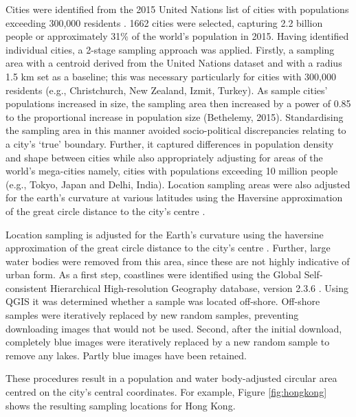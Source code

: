 \documentclass[final,3p,times,authoryear]{elsarticle}
\begin{document}
Cities were identified from the 2015 United Nations list of cities with populations exceeding 300,000 residents \citep{UN2014}. 1662 cities were selected, capturing 2.2 billion people or approximately 31\% of the world's population in 2015. Having identified individual cities, a 2-stage sampling approach was applied. Firstly, a sampling area with a centroid derived from the United Nations dataset and with a radius 1.5 km set as a baseline; this was necessary particularly for cities with 300,000 residents (e.g., Christchurch, New Zealand, Izmit, Turkey). As sample cities' populations increased in size, the sampling area then increased by a power of 0.85 to the proportional increase in population size (Bethelemy, 2015). Standardising the sampling area in this manner avoided socio-political discrepancies relating to a city's `true' boundary. Further, it captured differences in population density and shape between cities while also appropriately adjusting for areas of the world's mega-cities namely, cities with populations exceeding 10 million people (e.g., Tokyo, Japan and Delhi, India). Location sampling areas were also adjusted for the earth's curvature at various latitudes using the Haversine approximation of the great circle distance to the city's centre \citep{Sinnott1984}. 

Location sampling is adjusted for the Earth's curvature using the haversine approximation of the great circle distance to the city's centre \citep{Sinnott1984}. Further, large water bodies were removed from this area, since these are not highly indicative of urban form. As a first step, coastlines were identified using the Global Self-consistent Hierarchical High-resolution Geography database, version 2.3.6 \citep{Wessel1996}. Using QGIS \citep{QGIS2009} it was determined whether a sample was located off-shore. Off-shore samples were iteratively replaced by new random samples, preventing downloading images that would not be used. Second, after the initial download, completely blue images were iteratively replaced by a new random sample to remove any lakes. Partly blue images have been retained.

These procedures result in a population and water body-adjusted circular area centred on the city's central coordinates. For example, Figure \ref{fig:hongkong}  shows the resulting sampling locations for Hong Kong.
\end{document}
